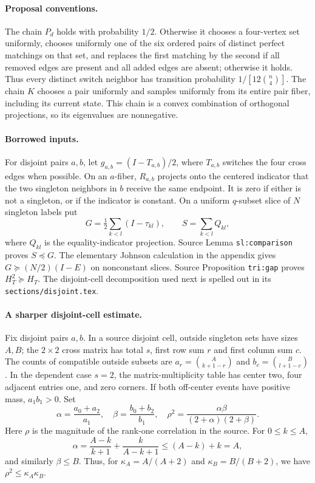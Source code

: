 \documentclass[11pt]{article}
\begin{document}
\paragraph{Proposal conventions.}
The chain $P_d$ holds with probability $1/2$. Otherwise it chooses a
four-vertex set uniformly, chooses uniformly one of the six ordered
pairs of distinct perfect matchings on that set, and replaces the first
matching by the second if all removed edges are present and all added
edges are absent; otherwise it holds. Thus every distinct switch
neighbor has transition probability $1/[12\binom n4]$.
The chain $K$ chooses a pair uniformly and samples uniformly from its
entire pair fiber, including its current state. This chain is a convex
combination of orthogonal projections, so its eigenvalues are nonnegative.

\paragraph{Borrowed inputs.}
For disjoint pairs $a,b$, let $g_{a,b}=(I-T_{a,b})/2$, where $T_{a,b}$
switches the four cross edges when possible. On an $a$-fiber, $R_{a,b}$
projects onto the centered indicator that the two singleton neighbors in
$b$ receive the same endpoint. It is zero if either is not a singleton,
or if the indicator is constant. On a uniform $q$-subset slice of $N$
singleton labels put
\[
 G=\tfrac12\sum_{k<l}(I-\tau_{kl}),\qquad S=\sum_{k<l}Q_{kl},
\]
where $Q_{kl}$ is the equality-indicator projection. Source Lemma
\texttt{sl:comparison} proves $S\preceq G$. The elementary Johnson calculation in the appendix
gives $G\succeq (N/2)(I-E)$ on nonconstant slices. Source Proposition
\texttt{tri:gap} proves $H_T^2\succeq H_T$. The disjoint-cell decomposition
used next is spelled out in its \texttt{sections/disjoint.tex}.

\paragraph{A sharper disjoint-cell estimate.}
Fix disjoint pairs $a,b$. In a source disjoint cell, outside singleton
sets have sizes $A,B$; the $2\times2$ cross matrix has total $s$, first
row sum $r$ and first column sum $c$. The counts of compatible outside
subsets are $a_r=\binom A{k+1-r}$ and $b_c=\binom B{l+1-c}$.
In the dependent case $s=2$, the matrix-multiplicity table has center
two, four adjacent entries one, and zero corners. If both off-center
events have positive mass, $a_1b_1>0$. Set
\[
 \alpha=\frac{a_0+a_2}{a_1},\quad
 \beta=\frac{b_0+b_2}{b_1},\quad
 \rho^2=\frac{\alpha\beta}{(2+\alpha)(2+\beta)}.
\]
Here $\rho$ is the magnitude of the rank-one correlation in the source.
For $0\le k\le A$,
\[
 \alpha=\frac{A-k}{k+1}+\frac{k}{A-k+1}\le(A-k)+k=A,
\]
and similarly $\beta\le B$. Thus, for $\kappa_A=A/(A+2)$ and
$\kappa_B=B/(B+2)$, we have $\rho^2\le\kappa_A\kappa_B$.
\end{document}
